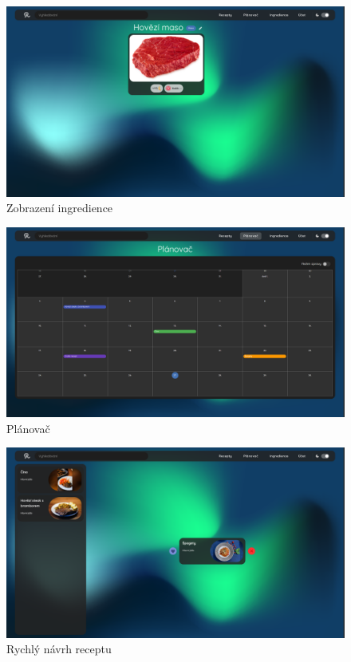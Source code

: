 \begin{figure}[H]
    \includegraphics[width=\textwidth]{images/final-look/zobrazeni-suroviny}
    \caption{Zobrazení ingredience} \label{picture:recipeo:zobrazeni-suroviny}
\end{figure}
\vspace*{\fill}

\vspace*{\fill}
\begin{figure}[H]
    \includegraphics[width=\textwidth]{images/final-look/planovac}
    \caption{Plánovač} \label{picture:recipeo:planovac}
\end{figure}

\begin{figure}[H]
    \includegraphics[width=\textwidth]{images/final-look/rychly-navrh}
    \caption{Rychlý návrh receptu} \label{picture:recipeo:rychly-navrh}
\end{figure}
\vspace*{\fill}

